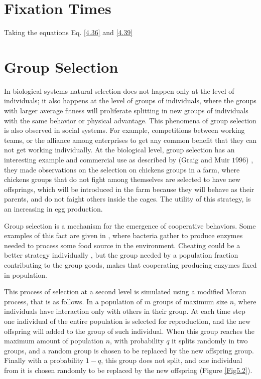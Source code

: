 \section{Fixation Times}
Taking the equations Eq. \eqref{4.36} and \eqref{4.39}
\section{Group Selection}
\cite{Goodnight1997a} \cite{Bower2004}\cite{Dunny2008}\cite{Wade1976}\cite{Shoresh2011}\cite{Nowak2011}\cite{Traulsen2006a}\cite{Gore2009}

In biological systems natural selection does not happen only at the level of individuals; it also happens at the level of groups of individuals\cite{Wade1976}, where the groups with larger average fitness will proliferate splitting in new groups of individuals with the same behavior or physical advantage. This phenomena of group selection is also observed in social systems. For example, competitions between working teams, or the alliance  among enterprises to get any common benefit  that they can not get working individually. At the biological level, group selection has an interesting example and commercial use as described by (Graig and Muir $1996$)\cite{Goodnight1997a} , they made observations on the selection  on chickens  groups in a farm, where chickens groups that do not fight among themselves are selected to have new offsprings, which will be introduced in the farm because they will behave as their parents, and do not faight others inside the cages. The utility of this strategy, is an increasing in egg production.
    
 Group selection is a mechanism for the emergence of cooperative behaviors\cite{Nowak2011}. Some examples of this fact are  given  in \cite{Dunny2008,Bower2004, Gore2009}, where bacteria gather to produce enzymes  needed to process  some food source in the environment. Cheating could be a better strategy individually , but the group needed by a population fraction contributing to the group goods, makes that cooperating producing enzymes fixed in population.  
     
     This process of selection at a second level is simulated using a modified Moran process, that is as follows\cite{Traulsen2006a,Shoresh2011}. In a population of $m$ groups of maximum size $n$, where individuals have interaction only with others in their group. At each time step one individual of the entire population is selected for reproduction, and the new offspring will added to the group of such individual. When this group reaches the maximum amount of population $n$, with probability $q$ it splits randomly in two groups, and a random group is chosen to be replaced by the new offspring group. Finally with a probability $1-q$, this group does not split, and one individual from it is chosen randomly to be replaced by the new offspring (Figure \ref{Fig5.2}). 
 

